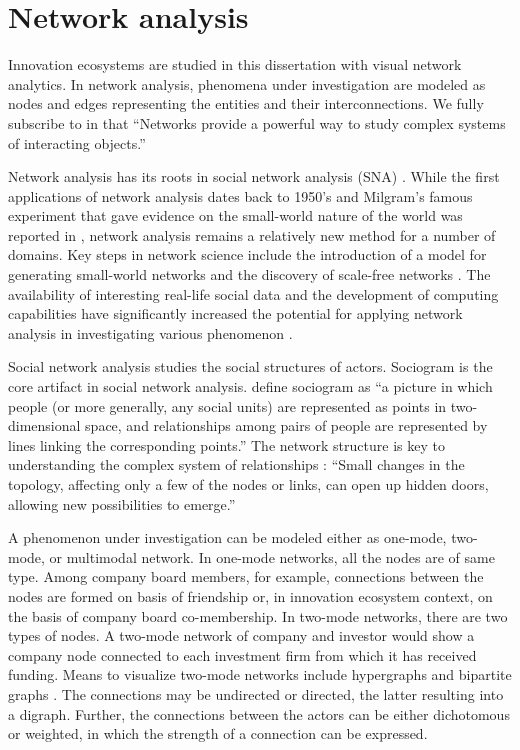 \section{Network analysis}
\label{sec:networkanalysis}

Innovation ecosystems are studied in this dissertation with visual network analytics. In network analysis, phenomena under investigation are modeled as nodes and edges representing the entities and their interconnections. We fully subscribe to \cite{Yang2014OverlappingNetworks} in that ``Networks provide a powerful way to study complex systems of interacting objects.'' 
 
Network analysis has its roots in social network analysis (SNA) \citep{Moreno1953,Wasserman1994SocialApplications}. While the first applications of network analysis dates back to 1950's and Milgram's famous experiment that gave evidence on the small-world nature of the world was reported in \citeyear{Milgram1967TheProblem} \citep{Milgram1967TheProblem}, network analysis remains a relatively new method for a number of domains. Key steps in network science include the introduction of a model for generating small-world networks \citep{Watts1998,Watts1999} and the discovery of scale-free networks \citep{Barabasi1999EmergenceNetworks}. The availability of interesting real-life social data and the development of computing capabilities have significantly increased the potential for applying network analysis in investigating various phenomenon \citep[cf.][]{Hansen2011AnalyzingWorld,Bastian2009Gephi:Networks}.

Social network analysis studies the social structures of actors. Sociogram is the core artifact in social network analysis. \cite{Wasserman1994SocialApplications} define sociogram as ``a picture in which people (or more generally, any social units) are represented as points in two-dimensional space, and relationships among pairs of people are represented by lines linking the corresponding points.'' The network structure is key to understanding the complex system of relationships \citep{Barabasi2003Linked:Means}: ``Small changes in the topology, affecting only a few of the nodes or links, can open up hidden doors, allowing new possibilities to emerge.''

A phenomenon under investigation can be modeled either as one-mode, two-mode, or multimodal network. In one-mode networks, all the nodes are of same type. Among company board members, for example, connections between the nodes are formed on basis of friendship or, in innovation ecosystem context, on the basis of company board co-membership. In two-mode networks, there are two types of nodes. A two-mode network of company and investor would show a company node connected to each investment firm from which it has received funding. Means to visualize two-mode networks include hypergraphs and bipartite graphs \citep{Freeman2000VisualizingNetworks, Jesus2009}. The connections may be undirected or directed, the latter resulting into a digraph. Further, the connections between the actors can be either dichotomous or weighted, in which the strength of a connection can be expressed.

